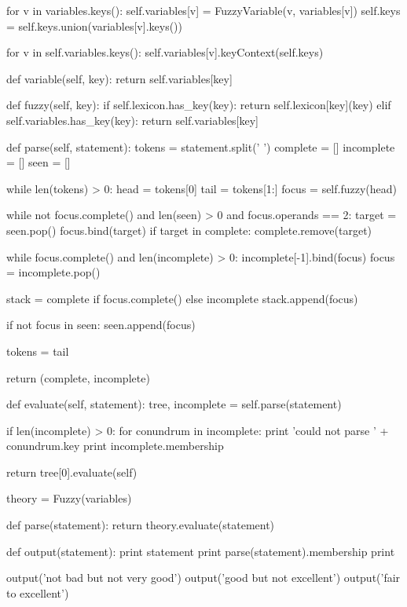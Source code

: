 \documentclass[12pt]{article}
\begin{document}
\begin{python}[]
    for v in variables.keys():
      self.variables[v] = FuzzyVariable(v, variables[v])
      self.keys = self.keys.union(variables[v].keys())

    for v in self.variables.keys():
      self.variables[v].keyContext(self.keys)

  def variable(self, key):
    return self.variables[key]

  def fuzzy(self, key):
    if self.lexicon.has_key(key):
      return self.lexicon[key](key)
    elif self.variables.has_key(key):
      return self.variables[key]

  def parse(self, statement):
    tokens = statement.split(' ')
    complete = []
    incomplete = []
    seen = []

    while len(tokens) > 0:
      head = tokens[0]
      tail = tokens[1:]
      focus = self.fuzzy(head)

      while not focus.complete() 
            and len(seen) > 0 
            and focus.operands == 2:
        target = seen.pop()
        focus.bind(target)
        if target in complete:
          complete.remove(target)

      while focus.complete() and len(incomplete) > 0:
        incomplete[-1].bind(focus)
        focus = incomplete.pop()

      stack = complete if focus.complete() else incomplete
      stack.append(focus)

      if not focus in seen:
        seen.append(focus)

      tokens = tail

    return (complete, incomplete)
        
  def evaluate(self, statement):
    tree, incomplete = self.parse(statement)

    if len(incomplete) > 0:
      for conundrum in incomplete:
        print 'could not parse ' + conundrum.key
        print incomplete.membership

    return tree[0].evaluate(self)

theory = Fuzzy(variables)

def parse(statement):
  return theory.evaluate(statement)

def output(statement):
  print statement
  print parse(statement).membership
  print

output('not bad but not very good')
output('good but not excellent')
output('fair to excellent')

\end{python}
\end{document}
